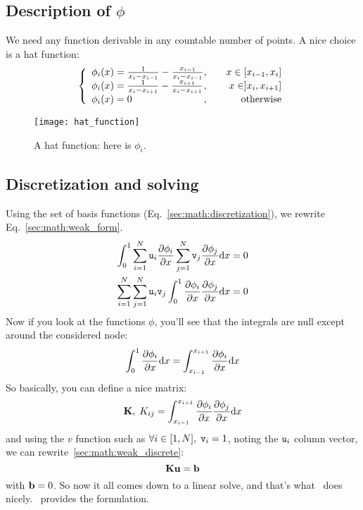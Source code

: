 \subsection{Description of \texorpdfstring{$\phi$}{the basis functions}}

We need any function derivable in any countable number of points. A nice
choice is a hat function:
\begin{equation}
\left\{\begin{array}{l@{,\qquad}r}
\phi_i(x) = \frac{1}{x_i - x_{i-1}} - \frac{x_{i-1}}{x_i - x_{i-1}} & x \in [x_{i-1},x_i] \\
\phi_i(x) = \frac{1}{x_i - x_{i+1}} - \frac{x_{i+1}}{x_i - x_{i+1}} & x \in ]x_i,x_{i+1}] \\
\phi_i(x) = 0                                                       & \text{otherwise}
\end{array}\right.
\end{equation}
\begin{figure}
\centering
\texttt{[image: hat\_function]}
\caption{\label{sec:math:hat_function}A hat function: here is $\phi_i$.}
\end{figure}

\subsection{Discretization and solving}

Using the set of basis functions (Eq.~\ref{sec:math:discretization}), we rewrite 
Eq.~\ref{sec:math:weak_form}.
\begin{equation}
\begin{split}
\int_0^1\sum_{i=1}^N\mathtt{u}_i\frac{\partial\phi_i}{\partial x}\sum_{j=1}^N\mathtt{v}_j\frac{\partial\phi_j}{\partial x} \mathrm{d} x & = 0 \\
\sum_{i=1}^N\sum_{j=1}^N\mathtt{u}_i\mathtt{v}_j\int_0^1\frac{\partial\phi_i}{\partial x}\frac{\partial\phi_j}{\partial x} \mathrm{d} x & = 0 \\
\end{split}
\label{sec:math:weak_discrete}
\end{equation}
Now if you look at the functions $\phi$, you'll see that the integrals are null except
around the considered node:
\begin{equation}
\int_0^1\frac{\partial\phi_i}{\partial x} \mathrm{d} x = \int_{x_{i-1}}^{x_{i+1}}\frac{\partial\phi_i}{\partial x} \mathrm{d} x
\end{equation}
So basically, you can define a nice matrix:
\begin{equation}
\mathbf{K},\; K_{ij} = \int_{x_{i-1}}^{x_{i+1}}\frac{\partial\phi_i}{\partial x}\frac{\partial\phi_j}{\partial x} \mathrm{d} x
\end{equation}
and using the $v$ function such as $\forall i \in [1,N], \; \mathtt{v}_i = 1$, noting
 the $\mathtt{u}_i$ column vector, we can
rewrite~\ref{sec:math:weak_discrete}:
\begin{equation}
\mathbf{K} \mathbf{u} = \mathbf{b}
\end{equation}
with $\mathbf{b} = 0$. So now it all comes down to a linear solve, and that's what
\libmesh\ does nicely. \grins\ provides the formulation.

